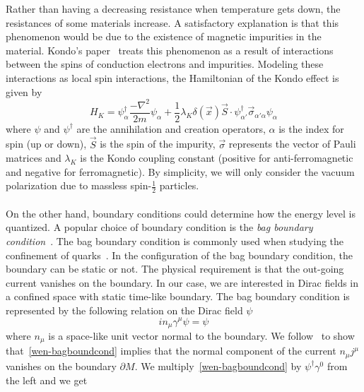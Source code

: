 Rather than having a decreasing resistance when temperature gets down,
the resistances of some materials increase. 
A satisfactory explanation is that this phenomenon would be due to the existence of magnetic impurities in the material. 
Kondo's paper~\cite{Kondo1964} treats this phenomenon as a result of interactions between the spins of conduction electrons and impurities.
Modeling these interactions as local spin interactions,
the Hamiltonian of the Kondo effect is given by~\cite{Erdmenger2013}
\begin{equation}\label{vacuum-kondohamiltonian}
H_K = \psi_\alpha^\dagger \frac{-\nabla^2}{2m}\psi_\alpha +
\frac 1 2\lambda_K \delta(\vec{x})\vec{S}\cdot \psi_{\alpha'}^\dagger  \vec{\sigma}_{\alpha' \alpha} \psi_\alpha
\end{equation}
where $\psi$ and $\psi^\dagger$ are the annihilation and creation operators, 
$\alpha$ is the index for spin (up or down), 
$\vec{S}$ is the spin of the impurity,
$\vec{\sigma}$ represents the vector of Pauli matrices and $\lambda_K$ is the Kondo coupling constant (positive for anti-ferromagnetic and negative for ferromagnetic).
By simplicity, we will only consider the vacuum polarization due to massless spin-$\frac 1 2$ particles. \\\\
%
On the other hand, boundary conditions could determine how the energy level is quantized.
A popular choice of boundary condition is the \textit{bag boundary condition}~\cite{Chodos1974}.
The bag boundary condition is commonly used when studying the confinement of quarks~\cite{Hasenfratz1978}.
In the configuration of the bag boundary condition, the boundary can be static or not. 
The physical requirement is that the out-going current vanishes on the boundary.
In our case, we are interested in Dirac fields in a confined space with static time-like boundary.
The bag boundary condition is represented by the following relation on the Dirac field $\psi$ 
\begin{equation}\label{wen-bagboundcond}
i n_\mu\gamma^\mu \psi = \psi
\end{equation}
where $n_\mu$ is a space-like unit vector normal to the boundary.
We follow~\cite{Stokes2015} to show that~\cref{wen-bagboundcond} implies that the normal component of the current $n_\mu j^\mu$ vanishes on the boundary $\partial M$.
We multiply~\cref{wen-bagboundcond} by $\psi^\dagger\gamma^0$ from the left and we get
